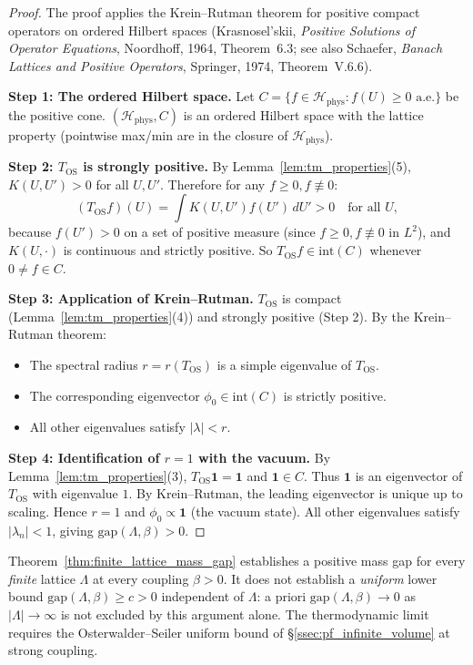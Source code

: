 \begin{proof}
The proof applies the Krein--Rutman theorem for positive compact operators on
ordered Hilbert spaces (Krasnosel'skii, \emph{Positive Solutions of Operator
Equations}, Noordhoff, 1964, Theorem~6.3; see also Schaefer, \emph{Banach
Lattices and Positive Operators}, Springer, 1974, Theorem~V.6.6).

\medskip\noindent\textbf{Step 1: The ordered Hilbert space.}
Let $C=\{f\in\mathcal{H}_{\mathrm{phys}} : f(U)\ge 0\text{ a.e.}\}$ be the
positive cone. $(\mathcal{H}_{\mathrm{phys}}, C)$ is an ordered Hilbert space
with the lattice property (pointwise max/min are in the closure of
$\mathcal{H}_{\mathrm{phys}}$).

\medskip\noindent\textbf{Step 2: $T_{\mathrm{OS}}$ is strongly positive.}
By Lemma~\ref{lem:tm_properties}(5), $K(U,U')>0$ for all $U,U'$. Therefore
for any $f\ge 0, f\not\equiv0$:
\[
(T_{\mathrm{OS}}f)(U)=\int K(U,U')f(U')\,dU'>0\quad\text{for all }U,
\]
because $f(U')>0$ on a set of positive measure (since $f\ge 0, f\not\equiv 0$
in $L^{2}$), and $K(U,\cdot)$ is continuous and strictly positive. So
$T_{\mathrm{OS}}f\in\mathrm{int}(C)$ whenever $0\ne f\in C$.

\medskip\noindent\textbf{Step 3: Application of Krein--Rutman.}
$T_{\mathrm{OS}}$ is compact (Lemma~\ref{lem:tm_properties}(4)) and strongly
positive (Step 2). By the Krein--Rutman theorem:
\begin{itemize}
\item The spectral radius $r=r(T_{\mathrm{OS}})$ is a simple eigenvalue of
  $T_{\mathrm{OS}}$.
\item The corresponding eigenvector $\phi_{0}\in\mathrm{int}(C)$ is strictly
  positive.
\item All other eigenvalues satisfy $|\lambda|<r$.
\end{itemize}

\medskip\noindent\textbf{Step 4: Identification of $r=1$ with the vacuum.}
By Lemma~\ref{lem:tm_properties}(3), $T_{\mathrm{OS}}\mathbf{1}=\mathbf{1}$ and
$\mathbf{1}\in C$. Thus $\mathbf{1}$ is an eigenvector of $T_{\mathrm{OS}}$ with
eigenvalue $1$. By Krein--Rutman, the leading eigenvector is unique up to
scaling. Hence $r=1$ and $\phi_{0}\propto\mathbf{1}$ (the vacuum state). All
other eigenvalues satisfy $|\lambda_{n}|<1$, giving $\mathrm{gap}(\Lambda,\beta)>0$.
\end{proof}

\begin{remark}
\label{rem:finite_vs_infinite}
Theorem~\ref{thm:finite_lattice_mass_gap} establishes a positive mass gap for
every \emph{finite} lattice $\Lambda$ at every coupling $\beta>0$. It does not
establish a \emph{uniform} lower bound $\mathrm{gap}(\Lambda,\beta)\ge c>0$
independent of $\Lambda$: a priori $\mathrm{gap}(\Lambda,\beta)\to 0$ as
$|\Lambda|\to\infty$ is not excluded by this argument alone. The thermodynamic
limit requires the Osterwalder--Seiler uniform bound of
\S\ref{ssec:pf_infinite_volume} at strong coupling.
\end{remark}

